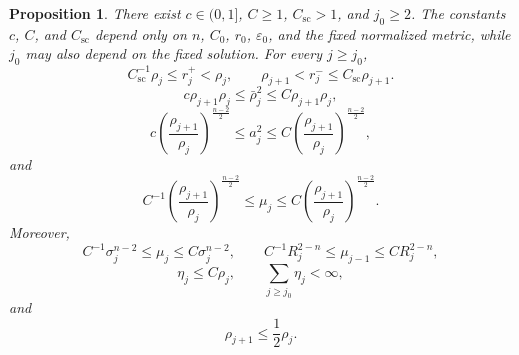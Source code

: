 \documentclass[11pt]{article}
\numberwithin{equation}{section}
\newtheorem{proposition}[theorem]{Proposition}
\theoremstyle{remark}
\newcommand{\eps}{\varepsilon}
\begin{document}
\begin{proposition}\label{prop:radial-scales}
{
There exist \(c\in(0,1]\), \(C\ge1\), \(C_{\mathrm{sc}}>1\), and
\(j_0\ge2\). The constants \(c\), \(C\), and \(C_{\mathrm{sc}}\) depend only on
\(n\), \(C_0\), \(r_0\), \(\eps_0\), and the fixed normalized metric,
while \(j_0\) may also depend on the fixed solution. For every \(j\ge j_0\),
\begin{equation}\label{eq:crossing-peak-comparison}
 C_{\mathrm{sc}}^{-1}\rho_j\le r_j^+<\rho_j,
 \qquad
 \rho_{j+1}<r_j^-\le C_{\mathrm{sc}}\rho_{j+1}.
\end{equation}
\begin{equation}\label{eq:minimum-geometric-mean}
 c\rho_{j+1}\rho_j
 \le\bar\rho_j^2
 \le C\rho_{j+1}\rho_j,
\end{equation}
\begin{equation}\label{eq:minimum-depth-ratio}
 c\left(\frac{\rho_{j+1}}{\rho_j}\right)^{\frac{n-2}{2}}
 \le a_j^2
 \le C\left(\frac{\rho_{j+1}}{\rho_j}\right)^{\frac{n-2}{2}},
\end{equation}
and
\begin{equation}\label{eq:mu-peak-ratio}
 C^{-1}\left(\frac{\rho_{j+1}}{\rho_j}\right)^{\frac{n-2}{2}}
 \le\mu_j
 \le
 C\left(\frac{\rho_{j+1}}{\rho_j}\right)^{\frac{n-2}{2}}.
\end{equation}
Moreover,
\begin{equation}\label{eq:capacity-scales}
 C^{-1}\sigma_j^{n-2}
 \le\mu_j\le C\sigma_j^{n-2},
 \qquad
 C^{-1}R_j^{2-n}
 \le\mu_{j-1}\le CR_j^{2-n},
\end{equation}
\begin{equation}\label{eq:metric-scale-summability}
 \eta_j\le C\rho_j,
 \qquad
 \sum_{j\ge j_0}\eta_j<\infty,
\end{equation}
and
\begin{equation}\label{eq:peak-halving}
 \rho_{j+1}\le\frac12\rho_j.
\end{equation}
}
\end{proposition}
\end{document}
